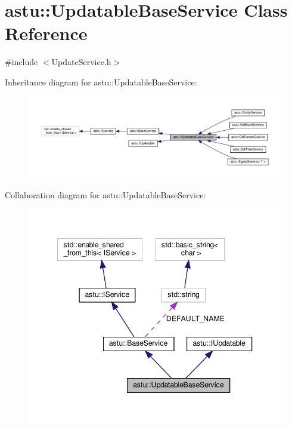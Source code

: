 \hypertarget{classastu_1_1UpdatableBaseService}{}\section{astu\+:\+:Updatable\+Base\+Service Class Reference}
\label{classastu_1_1UpdatableBaseService}


{\ttfamily \#include $<$Update\+Service.\+h$>$}



Inheritance diagram for astu\+:\+:Updatable\+Base\+Service\+:\nopagebreak
\begin{figure}[H]
\begin{center}
\leavevmode
\includegraphics[width=350pt]{classastu_1_1UpdatableBaseService__inherit__graph}
\end{center}
\end{figure}


Collaboration diagram for astu\+:\+:Updatable\+Base\+Service\+:\nopagebreak
\begin{figure}[H]
\begin{center}
\leavevmode
\includegraphics[width=347pt]{classastu_1_1UpdatableBaseService__coll__graph}
\end{center}
\end{figure}
